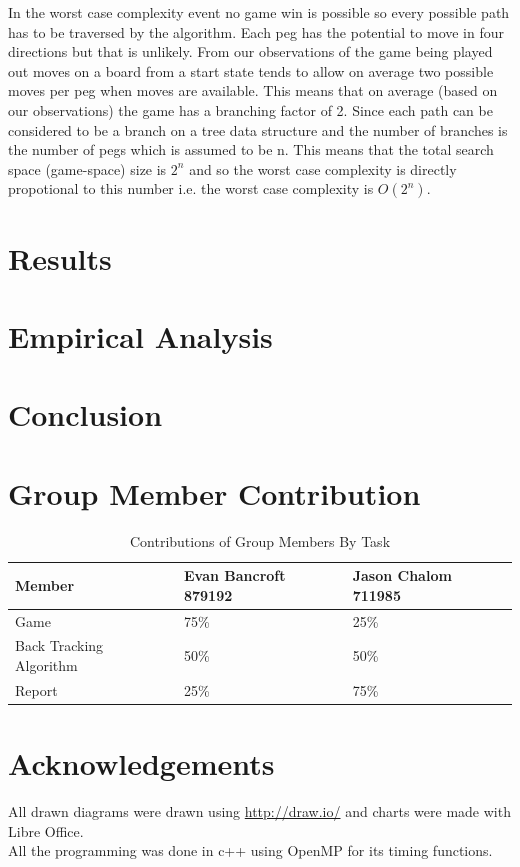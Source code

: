 \documentclass[a4paper]{article}
\begin{document}

\noindent In the worst case complexity event no game win is possible so every possible path has to be traversed by the algorithm. Each peg has the potential to move in four directions but that is unlikely. From our observations of the game being played out moves on a board from a start state tends to allow on average two possible moves per peg when moves are available. This means that on average (based on our observations) the game has a branching factor of 2. Since each path can be considered to be a branch on a tree data structure and the number of branches is the number of pegs which is assumed to be n. This means that the total search space (game-space) size is $2^n$ and so the worst case complexity is directly propotional to this number i.e. the worst case complexity is $O(2^n)$. 

\section{Results}

\section{Empirical Analysis}


\section{Conclusion}

\section{Group Member Contribution}
\begin{table}[H]
\centering
\label{contribution}
\begin{tabular}{|l|l|l|}
\hline
\textbf{Member}         & \textbf{Evan Bancroft 879192} & \textbf{Jason Chalom 711985} \\ \hline
Game                    & 75\%                          & 25\%                         \\ \hline
Back Tracking Algorithm & 50\%                          & 50\%                         \\ \hline
Report                  & 25\%                          & 75\%                         \\ \hline
\end{tabular}
\caption{Contributions of Group Members By Task}
\end{table}

\section*{Acknowledgements}
All drawn diagrams were drawn using \url{http://draw.io/} and charts were made with Libre Office.\\ 
All the programming was done in c++ using OpenMP for its timing functions.\\



{}
\end{document}
